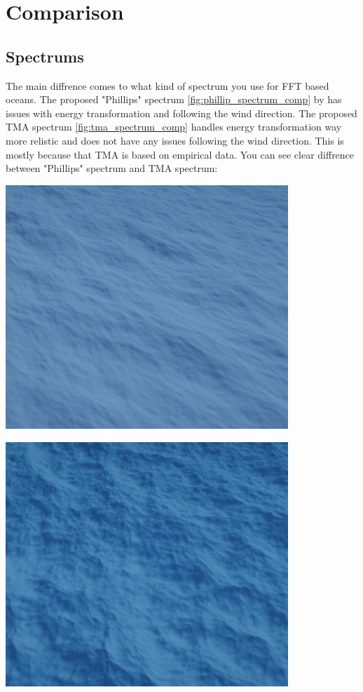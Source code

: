 \section{Comparison} 

\subsection{Spectrums}
The main diffrence comes to what kind of spectrum you use for FFT based oceans. The proposed "Phillips" spectrum \ref{fig:phillip_spectrum_comp} by \cite[J. Tessendorf]{tessendorf2001} has issues with energy transformation and following the wind direction. 
The proposed TMA spectrum \ref{fig:tma_spectrum_comp} handles energy transformation way more relistic and does not have any issues following the wind direction. This is mostly because that TMA is based on empirical data.
You can see clear diffrence between "Phillips" spectrum and TMA spectrum:

\begin{minipage}{0.48\textwidth}
    \centering
    \includegraphics[width=0.8\textwidth]{"images/phillip_spectrum_comp.png"}
    \label{fig:phillip_spectrum_comp}
\end{minipage}
\hfill
\begin{minipage}{0.48\textwidth}
    \centering
    \includegraphics[width=0.8\textwidth]{"images/tma_spectrum_comp.png"}
    \label{fig:tma_spectrum_comp}
\end{minipage}

